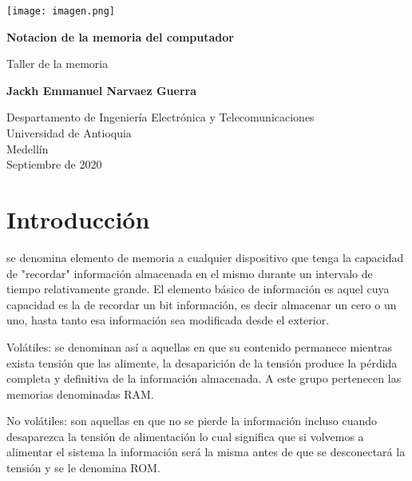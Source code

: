 \documentclass{article}
\begin{document}
\begin{titlepage}
\renewcommand{\headrulewidth}{3pt}
\fancyhead[L]{}
\fancyhead[R]{}
    \texttt{[image: imagen.png]}
    \begin{center}
        \vspace*{1cm} 
            
        \Huge
        \textbf{Notacion de la memoria del computador}
            
        \vspace{0.8 cm
}
        
        \LARGE
        Taller de la memoria 
            
        \vspace{1.5cm}
            
        \textbf{Jackh Emmanuel Narvaez Guerra}
            
        \vfill
            
        \vspace{0.8cm}
            
        \Large
        Despartamento de Ingeniería Electrónica y Telecomunicaciones\\
        Universidad de Antioquia\\
        Medellín\\
        Septiembre de 2020
            
    \end{center}
\end{titlepage}
\thispagestyle{fancy}

\tableofcontents
 
\section{Introducción}

se denomina elemento de memoria a cualquier dispositivo que tenga la capacidad de "recordar" información almacenada en el mismo durante un intervalo de tiempo relativamente grande. El elemento básico de información es aquel cuya capacidad es la de recordar un bit información, es decir almacenar un cero o un uno, hasta tanto esa información sea modificada desde el exterior.

Volátiles: se denominan así a aquellas en que su contenido permanece mientras exista tensión que las alimente, la desaparición de la tensión produce la pérdida completa y definitiva de la información almacenada. A este grupo pertenecen las memorias denominadas RAM.

No volátiles: son aquellas en que no se pierde la información incluso cuando desaparezca la tensión de alimentación lo cual significa que si volvemos a alimentar el sistema la información será la misma antes de que se desconectará la tensión y se le denomina ROM.
\end{document}
